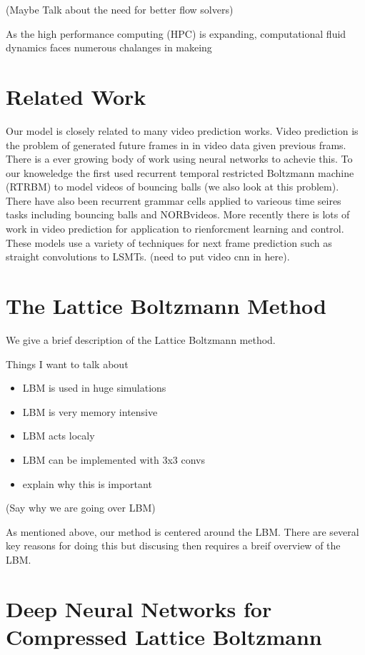 \documentclass{article}
\begin{document}
(Maybe Talk about the need for better flow solvers)

As the high performance computing (HPC) is expanding, computational fluid dynamics faces numerous chalanges in makeing 


\section{Related Work}

Our model is closely related to many video prediction works. Video prediction is the problem of generated future frames in in video data given previous frams. There is a ever growing body of work using neural networks to achevie this. To our knoweledge the first used recurrent temporal restricted Boltzmann machine (RTRBM) to model videos of bouncing balls (we also look at this problem). There have also been recurrent grammar cells applied to varieous time seires tasks including bouncing balls and NORBvideos. More recently there is lots of work in video prediction for application to rienforcment learning and control. These models use a variety of techniques for next frame prediction such as straight convolutions  to LSMTs. (need to put video cnn in here).

\section{The Lattice Boltzmann Method}

We give a brief description of the Lattice Boltzmann method.

Things I want to talk about

\begin{itemize}
  \item LBM is used in huge simulations
  \item LBM is very memory intensive
  \item LBM acts localy
  \item LBM can be implemented with 3x3 convs
  \item explain why this is important
\end{itemize}

(Say why we are going over LBM)

As mentioned above, our method is centered around the LBM. There are several key reasons for doing this but discusing then requires a breif overview of the LBM. 




\section{Deep Neural Networks for Compressed Lattice Boltzmann}
\end{document}
